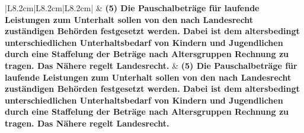 \documentclass[10pt,a4paper,landscape]{article}
\begin{document}
\begin{longtable}{|L{8.2cm}|L{8.2cm}|L{8.2cm}|}
 & \textbf{(5) Die Pauschalbeträge für laufende  \newline Leistungen zum Unterhalt sollen von  \newline den nach Landesrecht zuständigen  \newline Behörden festgesetzt werden. Dabei ist  \newline dem altersbedingt unterschiedlichen  \newline Unterhaltsbedarf von Kindern und  \newline Jugendlichen durch eine Staffelung der  \newline Beträge nach Altersgruppen Rechnung  \newline zu tragen. Das Nähere regelt  \newline Landesrecht. } & \textbf{(5) Die Pauschalbeträge für laufende  \newline Leistungen zum Unterhalt sollen von  \newline den nach Landesrecht zuständigen  \newline Behörden festgesetzt werden. Dabei ist  \newline dem altersbedingt unterschiedlichen  \newline Unterhaltsbedarf von Kindern und  \newline Jugendlichen durch eine Staffelung der  \newline Beträge nach Altersgruppen Rechnung  \newline zu tragen. Das Nähere regelt  \newline Landesrecht. } \\
\hhline{|---|}

\end{longtable}
\end{document}
